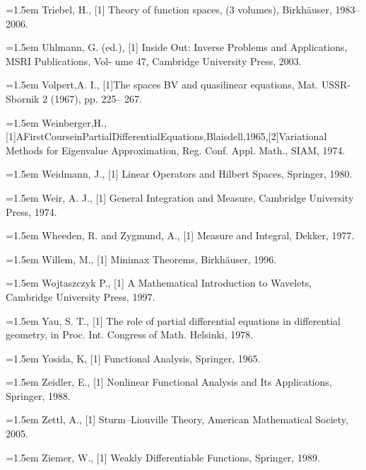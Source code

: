 \noindent\hangindent=1.5em Triebel, H., \hypertarget{ref:Triebel-1}{[1]} Theory of function spaces, (3 volumes), Birkhäuser, 1983--2006.\par{}
\noindent\hangindent=1.5em Uhlmann, G. (ed.), \hypertarget{ref:Uhlmann-1}{[1]} Inside Out: Inverse Problems and Applications, MSRI Publications, Vol- ume 47, Cambridge University Press, 2003.\par{}
\noindent\hangindent=1.5em Volpert,A. I., \hypertarget{ref:Volpert-1}{[1]}The spaces BV and quasilinear equations, Mat. USSR-Sbornik 2 (1967), pp. 225-- 267.\par{}
\noindent\hangindent=1.5em Weinberger,H.,\hypertarget{ref:Weinberger-1}{[1]}AFirstCourseinPartialDifferentialEquations,Blaisdell,1965,\hypertarget{ref:Weinberger-2}{[2]}Variational Methods for Eigenvalue Approximation, Reg. Conf. Appl. Math., SIAM, 1974.\par{}
\noindent\hangindent=1.5em Weidmann, J., \hypertarget{ref:Weidmann-1}{[1]} Linear Operators and Hilbert Spaces, Springer, 1980.\par{}
\noindent\hangindent=1.5em Weir, A. J., \hypertarget{ref:Weir-1}{[1]} General Integration and Measure, Cambridge University Press, 1974.\par{}
\noindent\hangindent=1.5em Wheeden, R. and Zygmund, A., \hypertarget{ref:WheedenZygmund-1}{[1]} Measure and Integral, Dekker, 1977.\par{}
\noindent\hangindent=1.5em Willem, M., \hypertarget{ref:Willem-1}{[1]} Minimax Theorems, Birkhäuser, 1996.\par{}
\noindent\hangindent=1.5em Wojtaszczyk P., \hypertarget{ref:Wojtaszczyk-1}{[1]} A Mathematical Introduction to Wavelets, Cambridge University Press, 1997.\par{}
\noindent\hangindent=1.5em Yau, S. T., \hypertarget{ref:Yau-1}{[1]} The role of partial differential equations in differential geometry, in Proc. Int. Congress of Math. Helsinki, 1978.\par{}
\noindent\hangindent=1.5em Yosida, K, \hypertarget{ref:Yosida-1}{[1]} Functional Analysis, Springer, 1965.\par{}
\noindent\hangindent=1.5em Zeidler, E., \hypertarget{ref:Zeidler-1}{[1]} Nonlinear Functional Analysis and Its Applications, Springer, 1988.\par{}
\noindent\hangindent=1.5em Zettl, A., \hypertarget{ref:Zettl-1}{[1]} Sturm--Liouville Theory, American Mathematical Society, 2005.\par{}
\noindent\hangindent=1.5em Ziemer, W., \hypertarget{ref:Ziemer-1}{[1]} Weakly Differentiable Functions, Springer, 1989.\par{}
